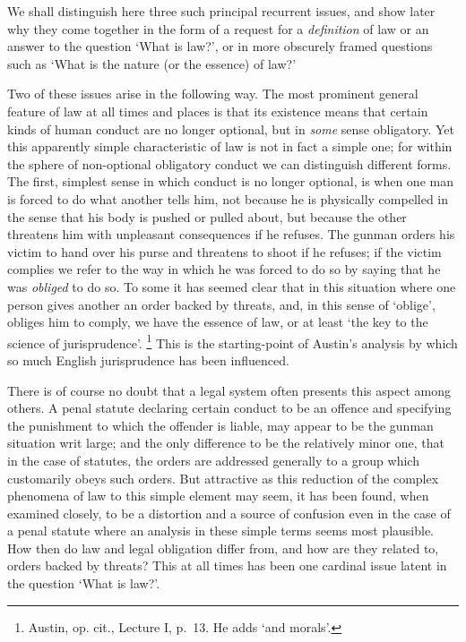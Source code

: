We shall distinguish here three such principal recurrent issues, and
show later why they come together in the form of a request for a
\emph{definition} of law or an answer to the question `What is law?', or
in more obscurely framed questions such as `What is the nature (or the
essence) of law?'

Two of these issues arise in the following way. The most prominent
general feature of law at all times and places is that its existence
means that certain kinds of human conduct are no longer optional, but in
\emph{some} sense obligatory. Yet this apparently simple characteristic
of law is not in fact a simple one; for within the sphere of
non-optional obligatory conduct we can distinguish different forms. The
first, simplest sense in which conduct is no longer optional, is when
one man is forced to do what another tells him, not because he is
physically compelled in the sense that his body is pushed or pulled
about, but because the other threatens him with unpleasant consequences
if he refuses. The gunman orders his victim to hand over his purse and
threatens to shoot if he refuses; if the victim complies we refer to the
way in which he was forced to do so by saying that he was \emph{obliged}
to do so. To some it has seemed clear that in this situation where one
person gives another an order backed by threats, and, in this sense of
`oblige', obliges him to comply, we have the essence of law, or at least
`the key to the science of jurisprudence'. \footnote{Austin, op. cit.,
  Lecture I, p.~13. He adds `and morals'.} This is the starting-point of
Austin's analysis by which so much English jurisprudence has been
influenced.

There is of course no doubt that a legal system often presents this
aspect among others. A penal statute declaring certain conduct to be an
offence and specifying the punishment to which the offender is liable,
may appear to be the gunman situation writ large; and the only
difference to be the relatively minor one, that in the case of statutes,
the orders are addressed generally to a group which customarily obeys
such orders. But attractive as this reduction of the complex phenomena
of law to this simple element may seem, it has been found, when examined
closely, to be a distortion and a source of confusion even in the case
of a penal statute where an analysis in these simple terms seems most
plausible. How then do law and legal obligation differ from, and how are
they related to, orders backed by threats? This at all times has been
one cardinal issue latent in the question `What is law?'.

